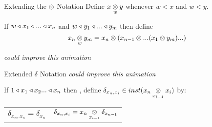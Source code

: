 
\newcommand{\inningsCrossSide}{\crossx{innings\kern-0.3cm}{\kern-0.3cm side}{match}}
\newcommand{\inningsCrossPlayer}{\crossx{innings\kern-0.3cm}{\kern-0.3cm player}{match}}
\newcommand{\fieldingSidePlayer}{fieldingSide ^* (\inningsCrossPlayer)}
\newcommand{\battingSidePlayer}{battingSide ^* (\inningsCrossPlayer)}
\newcommand{\overCrossFieldingSidePlayer}{\crossx{over\kern-0.4cm}{\kern-0.4cm(\fieldingSidePlayer)}{innings}}
\newcommand{\deliveryCrossBattingSidePlayer}{\crossx{delivery\kern-0.4cm}{\kern-0.4cm (\battingSidePlayer)}{innings}}

\begin{frame}{Extending the $\crossx{}{}{}$ Notation}
Define $\crossx{x}{y}{w}$ whenever $w < x$ and $w<y$.

If $w \base x_1 \base ... \base x_n $
and $w \base y_1 \base ... \base y_m$ then define 
$$\crossx{x_n}{y_m}{w}=x_n \cross ( x_{n-1} \cross ... (x_1 \cross y_m)...)$$

\textit{\Large could improve this animation}
\pause
\begin{center}

\end{center}
\end{frame}

\begin{frame}{Extended $\delta$ Notation}
\textit{\Large could improve this animation}

If $1 \base x_1 \base x_2 ... \base x_n$
then \foreachi, define 
$\delta_{x_n,x_i} \in inst(\crossx{x_n}{x_i}{x_{i-1}})$ by:
\begin{tabular}{c c}
$\delta_{x_n,x_n}=\delta_{x_n}$ & $\delta_{x_n,x_i}=\crossx{x_n}{\delta_{x_{n-1}}}{x_{i-1}}$
\end{tabular}
\begin{center}

\end{center}
\end{frame}

